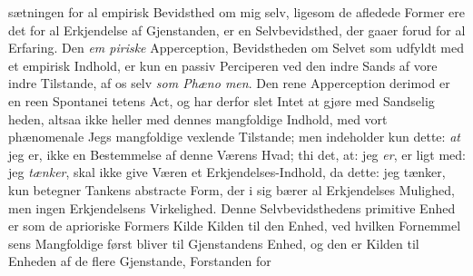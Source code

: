 \documentclass[12pt,a4paper]{book}
\begin{document}
sætningen for al empirisk Bevidsthed om mig selv, ligesom de
afledede Former ere det for al Erkjendelse af Gjenstanden, er
en Selvbevidsthed, der gaaer forud for al Erfaring. Den \emph{em\-%
piriske} Apperception, Bevidstheden om Selvet som udfyldt
med et empirisk Indhold, er kun en passiv Perciperen ved den
indre Sands af vore indre Tilstande, af os selv \emph{som Phæno\-%
men}. Den rene Apperception derimod er en reen Spontanei\-%
tetens Act, og har derfor slet Intet at gjøre med Sandselig\-%
heden, altsaa ikke heller med dennes mangfoldige Indhold, med
vort phænomenale Jegs mangfoldige vexlende Tilstande; men
indeholder kun dette: \emph{at} jeg er, ikke en Bestemmelse af denne
Værens Hvad; thi det, at: jeg \emph{er}, er ligt med: jeg \emph{tænker},
skal ikke give Væren et Erkjendelses-Indhold, da dette: jeg
tænker, kun betegner Tankens abstracte Form, der i sig bærer
al Erkjendelses Mulighed, men ingen Erkjendelsens Virkelighed.
Denne Selvbevidsthedens primitive Enhed er som de aprioriske
Formers Kilde Kilden til den Enhed, ved hvilken Fornemmel\-%
sens Mangfoldige først bliver til Gjenstandens Enhed, og den
er Kilden til Enheden af de flere Gjenstande, Forstanden for\-%
\end{document}
